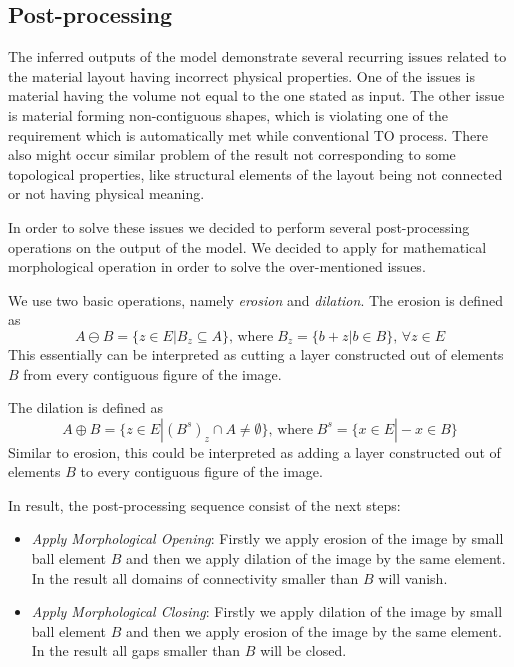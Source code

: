 
 
 
\subsection{Post-processing}

The inferred outputs of the model demonstrate several recurring issues related to the material layout having incorrect physical properties.
One of the issues is material having the volume not equal to the one stated as input.
The other issue is material forming non-contiguous shapes, which is violating one of the requirement which is automatically met while conventional TO process.
There also might occur similar problem of the result not corresponding to some topological properties, like structural elements of the layout being not connected or not having physical meaning.
\medskip

In order to solve these issues we decided to perform several post-processing operations on the output of the model.
We decided to apply for mathematical morphological operation in order to solve the over-mentioned issues.
\medskip

We use two basic operations, namely \textit{erosion} and \textit{dilation}.
The erosion is defined as 
\begin{equation}
A \ominus B = \{z \in E | B_{z} \subseteq A \}, \, \mathrm{where} \; B_{z}=\{ b+z | b \in B \}, \, \forall z \in E 
\end{equation} 
This essentially can be interpreted as cutting a layer constructed out of elements $B$ from every contiguous figure of the image.

The dilation is defined as 
\begin{equation}
A \oplus B = \{z \in E | (B^{s})_{z} \cap  A \neq \emptyset \}, \, \mathrm{where} \; B^{s}=\{x \in E | -x \in B \}
\end{equation} 
Similar to erosion, this could be interpreted as adding a layer constructed out of elements $B$ to every contiguous figure of the image. 
\medskip

In result, the post-processing sequence consist of the next steps:
\begin{itemize}
	\item \textit{Apply Morphological Opening}: Firstly we apply erosion of the image by small ball element $B$ and then we apply dilation of the image by the same element. In the result all domains of connectivity smaller than $B$ will vanish.
	\item \textit{Apply Morphological Closing}: Firstly we apply dilation of the image by small ball element $B$ and then we apply erosion of the image by the same element. In the result all gaps smaller than $B$ will be closed.
\end{itemize}

